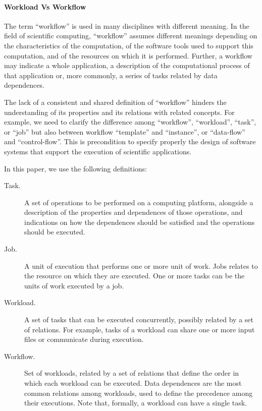 \paragraph*{Workload Vs Workflow} The term ``workflow'' is used in many
disciplines with different meaning. In the field of scientific computing,
``workflow'' assumes different meanings depending on the characteristics of the
computation, of the software tools used to support this computation, and of the
resources on which it is performed. Further, a workflow may indicate a whole
application, a description of the computational process of that application or,
more commonly, a series of tasks related by data dependences.

The lack of a consistent and shared definition of ``workflow'' hinders the
understanding of its properties and its relations with related concepts. For
example, we need to clarify the difference among ``workflow'', ``workload'',
``task'', or ``job'' but also between workflow ``template'' and ``instance'', or
``data-flow'' and ``control-flow''. This is precondition to specify properly the
design of software systems that support the execution of scientific
applications.

In this paper, we use the following definitions:

\begin{description}

  \item[Task.] A set of operations to be performed on a computing platform,
  alongside a description of the properties and dependences of those operations,
  and indications on how the dependences should be satisfied and the operations
  should be executed.

  \item[Job.] A unit of execution that performs one or more unit of work. Jobs
  relates to the resource on which they are executed. One or more tasks can be
  the units of work executed by a job.

  \item[Workload.] A set of tasks that can be executed concurrently, possibly
  related by a set of relations. For example, tasks of a workload can share one
  or more input files or communicate during execution.

  \item[Workflow.] Set of workloads, related by a set of relations that define
  the order in which each workload can be executed. Data dependences are the
  most common relations among workloads, used to define the precedence among
  their executions. Note that, formally, a workload can have a single task.

\end{description}

